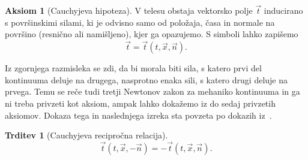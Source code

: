 \documentclass[12pt,a4paper,twoside]{article}
\theoremstyle{definition} %
\newtheorem{aksiom}{Aksiom}
\theoremstyle{plain} %
\newtheorem{trditev}[definicija]{Trditev}
\numberwithin{equation}{section}
\newcommand{\vt}{\vec{t}}
\newcommand{\vn}{\vec{n}}
\newcommand{\vx}{\vec{x}}
\begin{document}
\begin{aksiom}[Cauchyjeva hipoteza]
  V telesu obstaja vektorsko polje $\vt$ inducirano s površinskimi silami, ki
  je odvisno samo od položaja, časa in normale na površino (resnično ali
  namišljeno), kjer ga opazujemo. S simboli lahko zapišemo
  \begin{equation}
    \vt = \vt(t, \vx, \vn).
  \end{equation}
\end{aksiom}

Iz zgornjega razmisleka se zdi, da bi morala biti sila, s katero prvi del
kontinuuma deluje na drugega, nasprotno enaka sili, s katero drugi deluje na
prvega. Temu se reče tudi tretji Newtonov zakon za mehaniko kontinuuma in
ga ni treba privzeti kot aksiom, ampak lahko dokažemo iz do sedaj
privzetih aksiomov. Dokaza tega in naslednjega izreka sta povzeta po dokazih
iz~\cite[str.\ 104--107]{hjelmstad2007fundamentals}.
\begin{trditev}[Cauchyjeva recipročna relacija]
  \label{trd:cauchy-reciprocal}
  \begin{equation}
    \vt(t, \vx, -\vn) = -\vt(t, \vx, \vn).
    \label{eq:cauchy-reciprocal}
  \end{equation}
\end{trditev}
\end{document}
